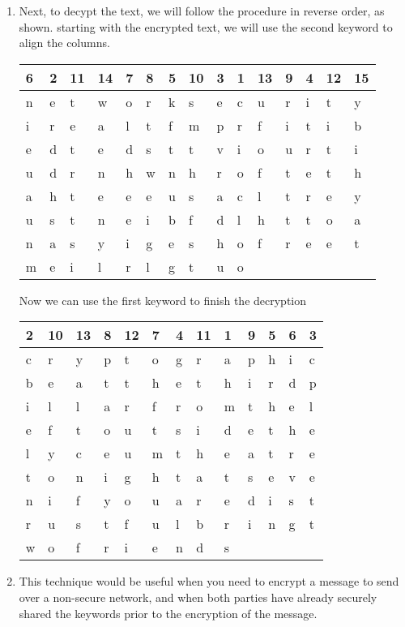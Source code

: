\documentclass[14pt]{article}
\begin{document}
\begin{enumerate}[label=(\alph*)]
\item Next, to decypt the text, we will follow the procedure in reverse order, as shown.
\newline
starting with the encrypted text, we will use the second keyword to align the columns.
\newline
\newline
\begin{tabular}{ l l l l l l l l l l l l l l l}
6 & 2 & 11 & 14 & 7 & 8 & 5 & 10 & 3 & 	1 & 13 & 9 & 4 & 12 & 15\\
\hline
n & e & t & w & o & r & k & s & e & c & u & r & i & t & y\\
\hline
i & r & e & a & l & t & f & m & p & r & f & i & t & i & b\\
e & d & t & e & d & s & t & t & v & i & o & u & r & t & i\\
u & d & r & n & h & w & n & h & r &  o & f & t & e & t & h\\
a & h & t & e & e & e & u & s & a & c & l & t & r & e & y\\
u & s & t & n & e & i & b & f & d & l & h & t & t & o & a\\
n & a & s & y & i & g & e & s & h & o & f & r & e & e & t\\
m & e & i & l & r & l & g & t & u & o\\
\end{tabular}
\newline
\newline
Now we can use the first keyword to finish the decryption
\newline
\newline
\begin{tabular}{ l l l l l l l l l l l l l }
2 & 10 & 13 & 8 & 12 & 7 & 4 & 11 & 1 & 9 & 5 & 6 & 3\\
\hline
c & r & y & p & t & o & g & r & a & p & h & i & c\\
\hline
b & e & a & t & t & h & e & t & h & i & r & d & p\\
i & l & l & a & r & f & r & o & m & t & h & e & l\\
e & f & t & o & u & t & s & i & d & e & t & h & e\\
l & y & c & e & u & m & t & h & e & a & t & r & e\\
t & o & n & i & g & h & t & a & t & s & e & v & e\\
n & i & f & y & o & u & a & r & e & d & i & s & t\\
r & u & s & t & f & u & l & b & r & i & n & g & t\\
w & o & f & r & i & e & n & d & s\\
\end{tabular}
\item This technique would be useful when you need to encrypt a message to send over a non-secure network, and when both parties have already securely shared the keywords prior to the encryption of the message.
\end{enumerate}
\end{document}
